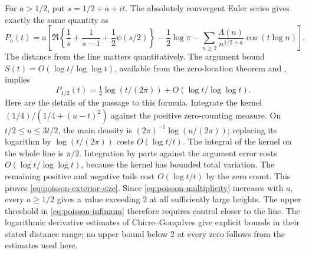 For $a>1/2$, put $s=1/2+a+it$. The absolutely convergent Euler
series gives exactly the same quantity as
\begin{equation}\label{eq:poisson-euler}
 P_a(t)=a\left[
 \Re\left\{\frac1s+\frac1{s-1}+\frac12\psi(s/2)\right\}
 -\frac12\log\pi
 -\sum_{n\ge2}\frac{\Lambda(n)}{n^{1/2+a}}\cos(t\log n)
 \right].
\end{equation}
The distance from the line matters quantitatively. The argument
bound $S(t)=O(\log t/\log\log t)$, available from the zero-location
theorem and \cite[Theorem~1, p.~2]{carneiro-chandee-milinovich2015},
implies
\begin{equation}\label{eq:poisson-exterior-size}
 P_{1/2}(t)=\tfrac14\log(t/(2\pi))
                +O(\log t/\log\log t).
\end{equation}
Here are the details of the passage to this formula. Integrate
the kernel $(1/4)/(1/4+(u-t)^2)$ against the positive zero-counting
measure. On $t/2\le u\le3t/2$, the main density is
$(2\pi)^{-1}\log(u/(2\pi))$; replacing its logarithm by
$\log(t/(2\pi))$ costs $O(\log t/t)$.
The integral of the kernel on the whole line is $\pi/2$.
Integration by parts against the argument error costs
$O(\log t/\log\log t)$, because the kernel has bounded total
variation. The remaining positive and negative tails cost
$O(\log t/t)$ by the zero count. This proves
\eqref{eq:poisson-exterior-size}.
Since \eqref{eq:poisson-multiplicity} increases with $a$, every
$a\ge1/2$ gives a value exceeding $2$ at all sufficiently large
heights. The upper threshold in \eqref{eq:poisson-infimum}
therefore requires control closer to the line. The logarithmic
derivative estimates of Chirre--Gon\c calves
\cite[Theorems~1--2 and (1.1)]{chirre-goncalves2022}
give explicit bounds in their stated distance range; no upper bound
below $2$ at every zero follows from the estimates used here.

